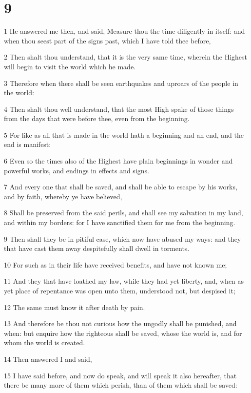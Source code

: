 \chapter{9}

\par 1 He answered me then, and said, Measure thou the time diligently in itself: and when thou seest part of the signs past, which I have told thee before,
\par 2 Then shalt thou understand, that it is the very same time, wherein the Highest will begin to visit the world which he made.
\par 3 Therefore when there shall be seen earthquakes and uproars of the people in the world:
\par 4 Then shalt thou well understand, that the most High spake of those things from the days that were before thee, even from the beginning.
\par 5 For like as all that is made in the world hath a beginning and an end, and the end is manifest:
\par 6 Even so the times also of the Highest have plain beginnings in wonder and powerful works, and endings in effects and signs.
\par 7 And every one that shall be saved, and shall be able to escape by his works, and by faith, whereby ye have believed,
\par 8 Shall be preserved from the said perils, and shall see my salvation in my land, and within my borders: for I have sanctified them for me from the beginning.
\par 9 Then shall they be in pitiful case, which now have abused my ways: and they that have cast them away despitefully shall dwell in torments.
\par 10 For such as in their life have received benefits, and have not known me;
\par 11 And they that have loathed my law, while they had yet liberty, and, when as yet place of repentance was open unto them, understood not, but despised it;
\par 12 The same must know it after death by pain.
\par 13 And therefore be thou not curious how the ungodly shall be punished, and when: but enquire how the righteous shall be saved, whose the world is, and for whom the world is created.
\par 14 Then answered I and said,
\par 15 I have said before, and now do speak, and will speak it also hereafter, that there be many more of them which perish, than of them which shall be saved:
